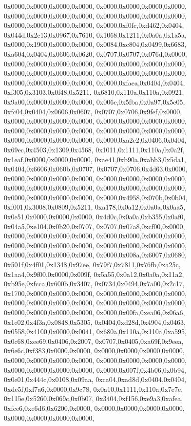 {	0x0000,0x0000,0x0000,0x0000,
	0x0000,0x0000,0x0000,0x0000,
	0x0000,0x0000,0x0000,0x0000,
	0x0000,0x0000,0x0000,0x0000,
	0x0000,0x0000,0x0000,0x0000,
	0x0000,0xf0fc,0xd462,0x0404,
	0x044d,0x2e13,0x0967,0x7610,
	0x1068,0x1211,0x0a0a,0x1a5a,
	0x0000,0x1900,0x0000,0x0000,
	0x0084,0xc804,0x0499,0x6683,
	0xa604,0x0404,0x0606,0x0620,
	0x0707,0x0707,0x076d,0x0000,
	0x0000,0x0000,0x0000,0x0000,
	0x0000,0x0000,0x0000,0x0000,
	0x0000,0x0000,0x0000,0x0000,
	0x0000,0x0000,0x0000,0x0000,
	0x0000,0x0000,0x0000,0x0000,
	0x0000,0xfaea,0x0404,0x0404,
	0xf305,0x3103,0x0f48,0x5211,
	0x6810,0x110a,0x110a,0x0921,
	0x9a00,0x0000,0x0000,0x0000,
	0x006e,0x5fba,0x0a97,0x5c05,
	0xfc04,0x0404,0x0606,0x0607,
	0x0707,0x0706,0x9fef,0x0000,
	0x0000,0x0000,0x0000,0x0000,
	0x0000,0x0000,0x0000,0x0000,
	0x0000,0x0000,0x0000,0x0000,
	0x0000,0x0000,0x0000,0x0000,
	0x0000,0x0000,0x0000,0x0000,
	0x0000,0xa2c2,0x0406,0x0404,
	0x69ec,0x4503,0x1309,0x4568,
	0x1011,0x1111,0x110a,0x0a2f,
	0x1eaf,0x0000,0x0000,0x0000,
	0xae41,0xb90a,0xabb3,0x5da1,
	0x0404,0x6606,0x060b,0x0707,
	0x0707,0x0706,0x4d63,0x0000,
	0x0000,0x0000,0x0000,0x0000,
	0x0000,0x0000,0x0000,0x0000,
	0x0000,0x0000,0x0000,0x0000,
	0x0000,0x0000,0x0000,0x0000,
	0x0000,0x0000,0x0000,0x0000,
	0x0000,0x4958,0x070b,0x0b04,
	0xf001,0x3008,0x0809,0x5211,
	0xa178,0x0a12,0x0a0a,0x0aa5,
	0x0e51,0x0000,0x0000,0x0000,
	0x4d0c,0x0a0a,0xb355,0x0af0,
	0x04a5,0xe104,0x0b20,0x0707,
	0x0707,0x07a8,0xcf00,0x0000,
	0x0000,0x0000,0x0000,0x0000,
	0x0000,0x0000,0x0000,0x0000,
	0x0000,0x0000,0x0000,0x0000,
	0x0000,0x0000,0x0000,0x0000,
	0x0000,0x0000,0x0000,0x0000,
	0x0000,0x008a,0x6007,0x0680,
	0x501f,0x4f01,0x1348,0x97ee,
	0x79f7,0x7811,0x76fb,0xa25c,
	0x1aa4,0x9f00,0x0000,0x009f,
	0x5a55,0x0a12,0x0a0a,0x11a2,
	0xb95e,0xfcca,0x600b,0x3407,
	0x0734,0x0494,0x7a00,0x2c17,
	0x1700,0x0000,0x0000,0x0000,
	0x0000,0x0000,0x0000,0x0000,
	0x0000,0x0000,0x0000,0x0000,
	0x0000,0x0000,0x0000,0x0000,
	0x0000,0x0000,0x0000,0x0000,
	0x0000,0x00fa,0xea06,0x06a6,
	0x1e02,0x4f3a,0x0848,0x5305,
	0x0404,0xd28d,0x4904,0x0463,
	0x0558,0x4100,0x0000,0x0041,
	0x680a,0x110a,0x110a,0xa595,
	0x0c68,0xee69,0x0406,0x2007,
	0x0707,0x0405,0xa69f,0x9eea,
	0x6e6c,0xf383,0x0000,0x0000,
	0x0000,0x0000,0x0000,0x0000,
	0x0000,0x0000,0x0000,0x0000,
	0x0000,0x0000,0x0000,0x0000,
	0x0000,0x0000,0x0000,0x0000,
	0x0000,0x007f,0x4b06,0x0b94,
	0x0e01,0x444c,0x0108,0x09aa,
	0xca04,0xad8d,0x0404,0x0404,
	0xde5f,0xf7a6,0x0000,0x9c78,
	0x0a10,0x1111,0x110a,0x7e7e,
	0x115e,0x5260,0x069c,0x0b07,
	0x3404,0xf156,0xe9a3,0xafea,
	0xfce6,0xe6d6,0x6200,0x0000,
	0x0000,0x0000,0x0000,0x0000,
	0x0000,0x0000,0x0000,0x0000,
}
